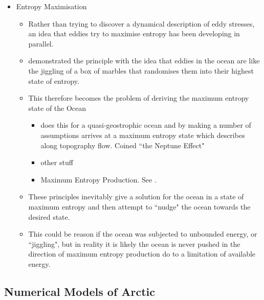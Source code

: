 \documentclass[10pt,a4paper]{article}
\begin{document}
                
                \begin{itemize}    
                	
                	\item Entropy  Maximisation
                	\begin{itemize}      
                		\item Rather than trying to discover a dynamical description of eddy stresses, an idea that eddies try to maximise entropy has been developing
                		in parallel.
                		\item \cite{holloway1987systematic} demonstrated the principle with
                		the idea that eddies in the ocean are like the jiggling of a box of 
                		marbles that randomises them into their highest state of entropy.
                		\item This therefore becomes the problem of deriving the maximum
                		entropy state of the Ocean
                		\begin{itemize}      
                			\item \cite{holloway1992representing} does this for a
                			 quasi-geostrophic ocean and by making a number of assumptions  
                			 arrives at a maximum entropy state which describes along 
                			 topography flow. Coined ``the Neptune Effect"
                			\item other stuff
                			\item Maximum Entropy Production. See \cite{polyakov2001eddy}.
                		\end{itemize}
                		\item These principles inevitably give a solution for the ocean in 
                		a state of maximum entropy and then attempt to ``nudge" the ocean
                		towards the desired state. 
                		\item This could be reason if the ocean was subjected to unbounded 
                		energy, or ``jiggling", but in reality it is likely the ocean is never
                		pushed in the direction of maximum entropy production do to
                		a limitation of available energy.
                	\end{itemize}  
                	
                \end{itemize}


\subsection{Numerical Models of Arctic}
	
\end{document}
